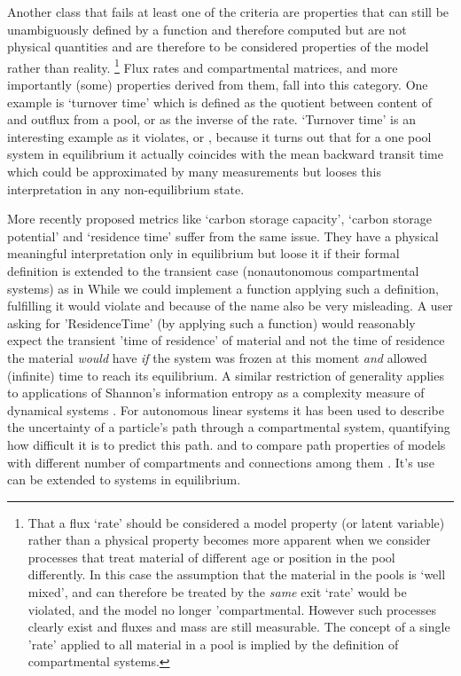 Another class that fails at least one of the criteria
are properties that can still be unambiguously defined by a function and
therefore computed but are not physical quantities and are therefore to be
considered properties of the model rather than reality. 
\footnote{
  That a flux `rate' should be considered a model property (or latent variable)
  rather than a physical property becomes more apparent when we consider
  processes that treat material of different age or position in the pool
  differently.  In this case the assumption that the material in the pools is
  `well mixed', and can therefore be treated by the \emph{same} exit `rate'
  would be violated, and the model no longer 'compartmental.  However such
  processes clearly exist and fluxes and mass are still measurable.  The
  concept of a single 'rate' applied to all material in a pool is implied by
  the definition of compartmental systems.
} 
Flux rates and compartmental matrices, and more importantly (some) properties derived from them, fall into  this category. 
One example is `turnover time' which is defined as the quotient between content of and outflux from a pool, or as the inverse of the rate. 
`Turnover time' is an interesting example as it violates,  or , 
because it turns out that for a one pool system in equilibrium it actually coincides with the mean backward transit time
which could be approximated by many measurements but looses this interpretation in any non-equilibrium state.

More recently proposed metrics 
like `carbon storage capacity',  `carbon storage potential' and `residence time' suffer from the same issue.
They have a physical meaningful interpretation only in equilibrium 
but loose it if their formal definition is extended to the transient case (nonautonomous compartmental systems) as in \citep{Luo2017Biogeosciences}
While we could implement a function applying such a definition, fulfilling  it would violate  and because of the name also be very misleading. 
A user asking for  'ResidenceTime' (by applying such a function) would reasonably expect the transient 'time of residence' of material and not the time of residence the material  
\emph{would} have \emph{if} the system was frozen at this moment \emph{and} allowed (infinite) time to reach its equilibrium.
A similar restriction of generality applies to applications of Shannon's information entropy as a complexity measure 
of dynamical systems \citep{Ebeling1998}. 
For 
autonomous linear systems it has 
been used to describe the uncertainty of a particle's path through a
compartmental system, quantifying how difficult it is to predict this path. 
and to compare path properties of models with different number of
compartments and connections among them \citep{Metzler2020}. 
It's use can be extended to systems in equilibrium.

